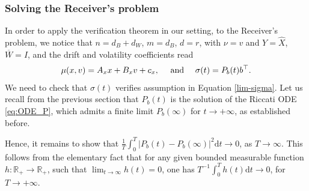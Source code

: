 \documentclass[a4paper,10pt]{article}
\newcommand{\D}{\mathrm{d}}
\theoremstyle{definition}
\theoremstyle{plain}
\numberwithin{equation}{section}
\begin{document}
\subsubsection{Solving the Receiver's problem} In order to apply the verification theorem in our setting, to the Receiver's problem, we notice that  
$n=d_B+d_W$, $m=d_B$, $d=r$, with $\nu=v$ and $Y=\widehat X$, $\overline W = I$, and the drift and volatility coefficients read
\begin{align}
    \mu(x, v)= A_{\rm x} x + B_{\rm x} v + c_{\rm x},
    \quad \text{ and } \quad
    \sigma(t) = P_b(t)b^\top.
\end{align}
We need to check that $\sigma(t)$ verifies assumption in Equation \eqref{lim-sigma}. 
Let us recall from the previous section that $P_b(t)$ is the solution of the Riccati ODE \eqref{eq:ODE_P}, which admits a finite limit $P_b(\infty)$ for $t \to +\infty$, as established before.

Hence, it remains to show that $\frac{1}{T}\int_0 ^T |P_b(t) - P_b(\infty)|^2 \D t \to 0$, as $T \to \infty$. This follows from the elementary fact that for any given bounded measurable function $h:\mathbb R_+ \to \mathbb R_+$, such that $\lim_{t \to \infty} h(t) = 0$, one has $T^{-1}\int_0 ^T h(t) \D t \to 0$, for $T \to +\infty$.\medskip
\end{document}
